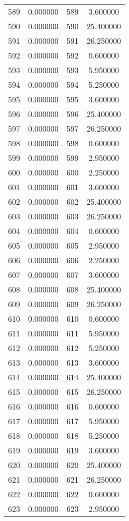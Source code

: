 \documentclass[12pt]{article}
\begin{document}
\begin{longtable}{@{}cccc@{}}
589 & 0.000000 & 589 & 3.600000 \\
590 & 0.000000 & 590 & 25.400000 \\
591 & 0.000000 & 591 & 26.250000 \\
592 & 0.000000 & 592 & 0.600000 \\
593 & 0.000000 & 593 & 5.950000 \\
594 & 0.000000 & 594 & 5.250000 \\
595 & 0.000000 & 595 & 3.600000 \\
596 & 0.000000 & 596 & 25.400000 \\
597 & 0.000000 & 597 & 26.250000 \\
598 & 0.000000 & 598 & 0.600000 \\
599 & 0.000000 & 599 & 2.950000 \\
600 & 0.000000 & 600 & 2.250000 \\
601 & 0.000000 & 601 & 3.600000 \\
602 & 0.000000 & 602 & 25.400000 \\
603 & 0.000000 & 603 & 26.250000 \\
604 & 0.000000 & 604 & 0.600000 \\
605 & 0.000000 & 605 & 2.950000 \\
606 & 0.000000 & 606 & 2.250000 \\
607 & 0.000000 & 607 & 3.600000 \\
608 & 0.000000 & 608 & 25.400000 \\
609 & 0.000000 & 609 & 26.250000 \\
610 & 0.000000 & 610 & 0.600000 \\
611 & 0.000000 & 611 & 5.950000 \\
612 & 0.000000 & 612 & 5.250000 \\
613 & 0.000000 & 613 & 3.600000 \\
614 & 0.000000 & 614 & 25.400000 \\
615 & 0.000000 & 615 & 26.250000 \\
616 & 0.000000 & 616 & 0.600000 \\
617 & 0.000000 & 617 & 5.950000 \\
618 & 0.000000 & 618 & 5.250000 \\
619 & 0.000000 & 619 & 3.600000 \\
620 & 0.000000 & 620 & 25.400000 \\
621 & 0.000000 & 621 & 26.250000 \\
622 & 0.000000 & 622 & 0.600000 \\
623 & 0.000000 & 623 & 2.950000 \\

\end{longtable}
\end{document}
